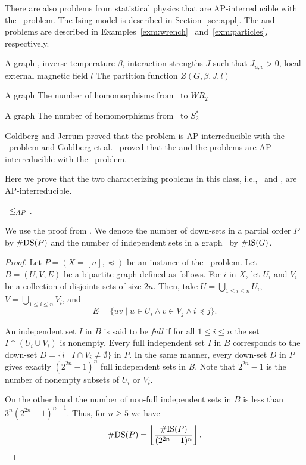 There are also problems from statistical physics that are AP-interreducible with the \cbis\
problem. The Ising model is described in Section~\ref{sec:appl}.
The \pname{\#2-Wrench-Coloring}
and  problems are described in Examples~\ref{exm:wrench}~
and~\ref{exm:particles}, respectively.

{A graph \mG, inverse temperature \(\beta\), interaction strengths \(J\) such that
\(J_{u,v} > 0\), local external magnetic field \(l\)}
{The partition function \(Z(G,\beta,J,l)\)}

{A graph \mG}
{The number of homomorphisms from \mG\ to \(WR_2\)}

{A graph \mG}
{The number of homomorphisms  from \mG\ to \(S^*_2\)}

Goldberg and Jerrum \cite{Goldberg2007} proved that the  problem 
is AP-interreducible with the \cbis\ problem and 
Goldberg et al.~\cite{Leslie03} proved that the  and
the \pname{\#2-Particles-WR-Configs} problems are  AP-interreducible with the \cbis\ problem.

Here we prove that the two characterizing problems in this class, i.e., \cbis\ and \cdsp,
are AP-interreducible.
\begin{lemma} \label{lem:dstobis}
\cdsp\ \(\le_{AP}\) \cbis\@.
\end{lemma}

We use the proof from \cite{counting}\@. We denote the number of down-sets in a partial order 
\(P\) by \(\#\mathrm{DS}(P)\) and the number of independent sets in a graph \mG\ by
\(\#\mathrm{IS}(G)\)\@.
\begin{proof}
Let \(P=(X=[n],\preceq)\) be an instance of the \cdsp\ problem. 
Let \(B=(U,V,E)\) be a bipartite graph defined as follows.
For \(i\) in \(X\), let \(U_i\) and \(V_i\) be a collection of disjoints sets of
size \(2n\)\@. Then, take \(U=\bigcup_{1 \le i \le n} U_i\), \(V=\bigcup_{1 \le i\le n} V_i\), and
\[E = \{uv \mid u \in U_i \land v \in V_j \land i \preceq j\}.\]

An independent set \(I\) in \(B\) is said to be \emph{full} if for all \(1 \le i \le n\)
the set \(I\cap (U_i \cup V_i)\) is nonempty. Every full independent set \(I\) in \(B\)
corresponds to the down-set \(D=\{i \mid I \cap V_i \neq \emptyset\}\) in \(P\)\@.
In the same manner, every down-set \(D\) in \(P\) gives exactly \((2^{2n}-1)^n\) full independent
sets in \(B\)\@. Note that \(2^{2n}-1\) is the number of nonempty subsets of \(U_i\)
or \(V_i\)\@.

On the other hand the number of non-full independent sets in \(B\) is less than
\(3^n(2^{2n}-1)^{n-1}\)\@. Thus, for \(n\ge 5\) we have 
\[\#\mathrm{DS}(P) = \left\lfloor\frac{\#\mathrm{IS}(P)}{(2^{2n}-1)^n} \right\rfloor .\]
\end{proof}

